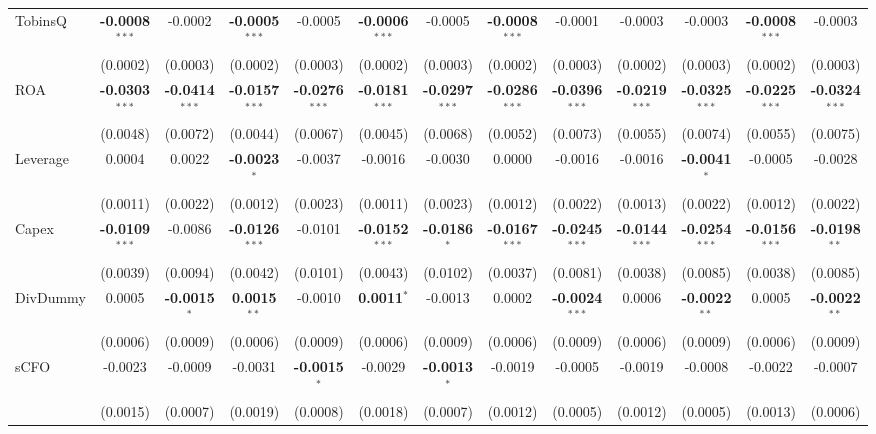 \begin{landscape}
\begin{table}[H]
\begin{tabular}{lcccccccccccc}
TobinsQ & \textbf{-0.0008}$^{***}$ & -0.0002 & \textbf{-0.0005}$^{***}$ & -0.0005 & \textbf{-0.0006}$^{***}$ & -0.0005 & \textbf{-0.0008}$^{***}$ & -0.0001 & -0.0003 & -0.0003 & \textbf{-0.0008}$^{***}$ & -0.0003 \\
 & (0.0002) & (0.0003) & (0.0002) & (0.0003) & (0.0002) & (0.0003) & (0.0002) & (0.0003) & (0.0002) & (0.0003) & (0.0002) & (0.0003) \\
ROA & \textbf{-0.0303}$^{***}$ & \textbf{-0.0414}$^{***}$ & \textbf{-0.0157}$^{***}$ & \textbf{-0.0276}$^{***}$ & \textbf{-0.0181}$^{***}$ & \textbf{-0.0297}$^{***}$ & \textbf{-0.0286}$^{***}$ & \textbf{-0.0396}$^{***}$ & \textbf{-0.0219}$^{***}$ & \textbf{-0.0325}$^{***}$ & \textbf{-0.0225}$^{***}$ & \textbf{-0.0324}$^{***}$ \\
 & (0.0048) & (0.0072) & (0.0044) & (0.0067) & (0.0045) & (0.0068) & (0.0052) & (0.0073) & (0.0055) & (0.0074) & (0.0055) & (0.0075) \\
Leverage & 0.0004 & 0.0022 & \textbf{-0.0023}$^{*}$ & -0.0037 & -0.0016 & -0.0030 & 0.0000 & -0.0016 & -0.0016 & \textbf{-0.0041}$^{*}$ & -0.0005 & -0.0028 \\
 & (0.0011) & (0.0022) & (0.0012) & (0.0023) & (0.0011) & (0.0023) & (0.0012) & (0.0022) & (0.0013) & (0.0022) & (0.0012) & (0.0022) \\
Capex & \textbf{-0.0109}$^{***}$ & -0.0086 & \textbf{-0.0126}$^{***}$ & -0.0101 & \textbf{-0.0152}$^{***}$ & \textbf{-0.0186}$^{*}$ & \textbf{-0.0167}$^{***}$ & \textbf{-0.0245}$^{***}$ & \textbf{-0.0144}$^{***}$ & \textbf{-0.0254}$^{***}$ & \textbf{-0.0156}$^{***}$ & \textbf{-0.0198}$^{**}$ \\
 & (0.0039) & (0.0094) & (0.0042) & (0.0101) & (0.0043) & (0.0102) & (0.0037) & (0.0081) & (0.0038) & (0.0085) & (0.0038) & (0.0085) \\
DivDummy & 0.0005 & \textbf{-0.0015}$^{*}$ & \textbf{0.0015}$^{**}$ & -0.0010 & \textbf{0.0011}$^{*}$ & -0.0013 & 0.0002 & \textbf{-0.0024}$^{***}$ & 0.0006 & \textbf{-0.0022}$^{**}$ & 0.0005 & \textbf{-0.0022}$^{**}$ \\
 & (0.0006) & (0.0009) & (0.0006) & (0.0009) & (0.0006) & (0.0009) & (0.0006) & (0.0009) & (0.0006) & (0.0009) & (0.0006) & (0.0009) \\
sCFO & -0.0023 & -0.0009 & -0.0031 & \textbf{-0.0015}$^{*}$ & -0.0029 & \textbf{-0.0013}$^{*}$ & -0.0019 & -0.0005 & -0.0019 & -0.0008 & -0.0022 & -0.0007 \\
 & (0.0015) & (0.0007) & (0.0019) & (0.0008) & (0.0018) & (0.0007) & (0.0012) & (0.0005) & (0.0012) & (0.0005) & (0.0013) & (0.0006) \\

\end{tabular}
\end{table}
\end{landscape}
